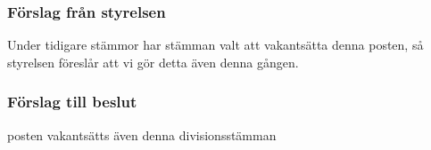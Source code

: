 \documentclass[protokoll]{dvd}
\begin{document}
\subsubsection*{Förslag från styrelsen}
Under tidigare stämmor har stämman valt att vakantsätta denna posten,
så styrelsen föreslår att vi gör detta även denna gången.

\subsubsection*{Förslag till beslut}
\begin{attsatser}
    \item posten vakantsätts även denna divisionsstämman
\end{attsatser}




\end{document}
